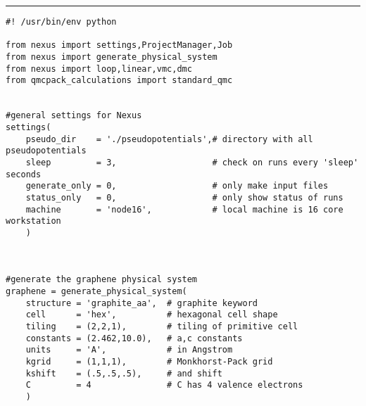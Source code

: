 \documentclass[oneside,11pt]{memoir}
\numberwithin{equation}{section}
\newcommand{\HRule}{\rule{\linewidth}{0.5mm}}
\begin{document}
\HRule
\begin{verbatim}
#! /usr/bin/env python

from nexus import settings,ProjectManager,Job
from nexus import generate_physical_system
from nexus import loop,linear,vmc,dmc
from qmcpack_calculations import standard_qmc


#general settings for Nexus
settings(
    pseudo_dir    = './pseudopotentials',# directory with all pseudopotentials
    sleep         = 3,                   # check on runs every 'sleep' seconds
    generate_only = 0,                   # only make input files
    status_only   = 0,                   # only show status of runs
    machine       = 'node16',            # local machine is 16 core workstation
    )



#generate the graphene physical system
graphene = generate_physical_system(
    structure = 'graphite_aa',  # graphite keyword
    cell      = 'hex',          # hexagonal cell shape
    tiling    = (2,2,1),        # tiling of primitive cell
    constants = (2.462,10.0),   # a,c constants
    units     = 'A',            # in Angstrom
    kgrid     = (1,1,1),        # Monkhorst-Pack grid
    kshift    = (.5,.5,.5),     # and shift
    C         = 4               # C has 4 valence electrons
    ) 



\end{verbatim}
\end{document}
